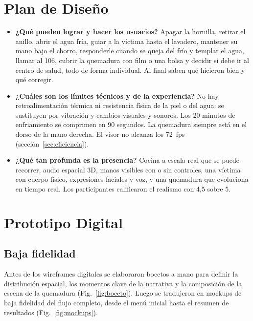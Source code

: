 \documentclass[11pt,a4paper]{article}
\begin{document}
\section{Plan de Diseño}
\begin{itemize}
    \item \textbf{¿Qué pueden lograr y hacer los usuarios?} Apagar la hornilla, retirar el anillo, abrir el agua fría, guiar a la víctima hasta el lavadero, mantener su mano bajo el chorro, responderle cuando se queja del frío y templar el agua, llamar al 106, cubrir la quemadura con film o una bolsa y decidir si debe ir al centro de salud, todo de forma individual. Al final saben qué hicieron bien y qué corregir.
    \item \textbf{¿Cuáles son los límites técnicos y de la experiencia?} No hay retroalimentación térmica ni resistencia física de la piel o del agua: se sustituyen por vibración y cambios visuales y sonoros. Los 20 minutos de enfriamiento se comprimen en 90 segundos. La quemadura siempre está en el dorso de la mano derecha. El visor no alcanza los 72~fps (sección~\ref{sec:eficiencia}).
    \item \textbf{¿Qué tan profunda es la presencia?} Cocina a escala real que se puede recorrer, audio espacial 3D, manos visibles con o sin controles, una víctima con cuerpo físico, expresiones faciales y voz, y una quemadura que evoluciona en tiempo real. Los participantes calificaron el realismo con 4,5 sobre 5.
\end{itemize}

\FloatBarrier

\section{Prototipo Digital}

\subsection{Baja fidelidad}
Antes de los wireframes digitales se elaboraron bocetos a mano para definir la distribución espacial, los momentos clave de la narrativa y la composición de la escena de la quemadura (Fig.~\ref{fig:boceto}). Luego se tradujeron en mockups de baja fidelidad del flujo completo, desde el menú inicial hasta el resumen de resultados (Fig.~\ref{fig:mockups}).
\end{document}
